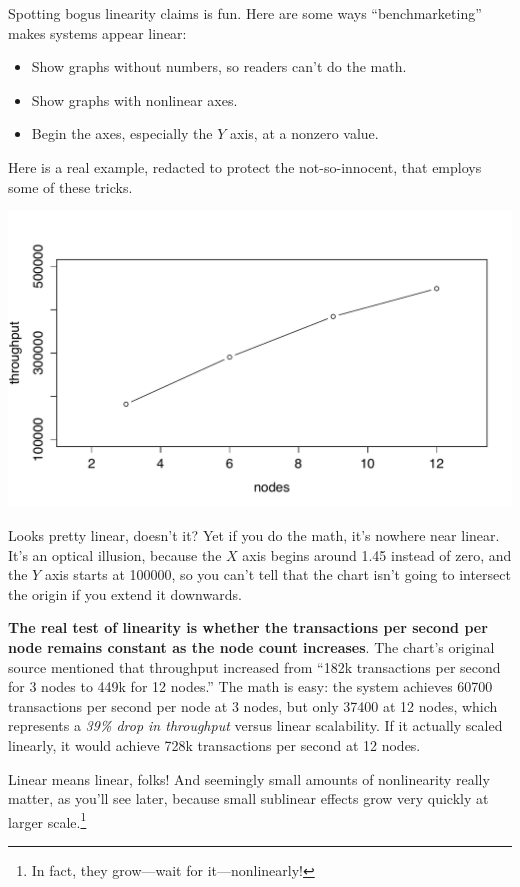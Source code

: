 \documentclass{vivid_layout}
\begin{document}
Spotting bogus linearity claims is fun. Here are some ways
``benchmarketing'' makes systems appear linear:

\begin{itemize}
\item Show graphs without numbers, so readers can't do the math.
\item Show graphs with nonlinear axes.
\item Begin the axes, especially the $Y$ axis, at a nonzero value.
\end{itemize}

Here is a real example, redacted to protect the not-so-innocent, that employs
some of these tricks.
\begin{center}
\includegraphics[width=.85\linewidth]{scalability/voltdb1}
\end{center}
Looks pretty linear, doesn't it? Yet if you do the math, it's nowhere near
linear.  It's an optical illusion, because the $X$ axis begins around
1.45 instead of zero, and the $Y$ axis starts at 100000, so you can't tell that
the chart isn't going to intersect the origin if you extend it downwards.

{\bfseries The real test of linearity is whether the transactions per second per
node remains constant as the node count increases}. The chart's original source
mentioned that throughput increased from ``182k transactions per second for 3
nodes to 449k for 12 nodes.'' The math is easy: the system achieves 60700
transactions per second per node at 3 nodes, but only 37400 at 12 nodes, which
represents a {\itshape 39\% drop in throughput} versus linear scalability.  If
it actually scaled linearly, it would achieve 728k transactions per second at 12
nodes.

Linear means linear, folks! And seemingly small amounts of nonlinearity really
matter, as you'll see later, because small sublinear effects grow very quickly
at larger scale.\footnote{In fact, they grow---wait for it---nonlinearly!}
\end{document}
